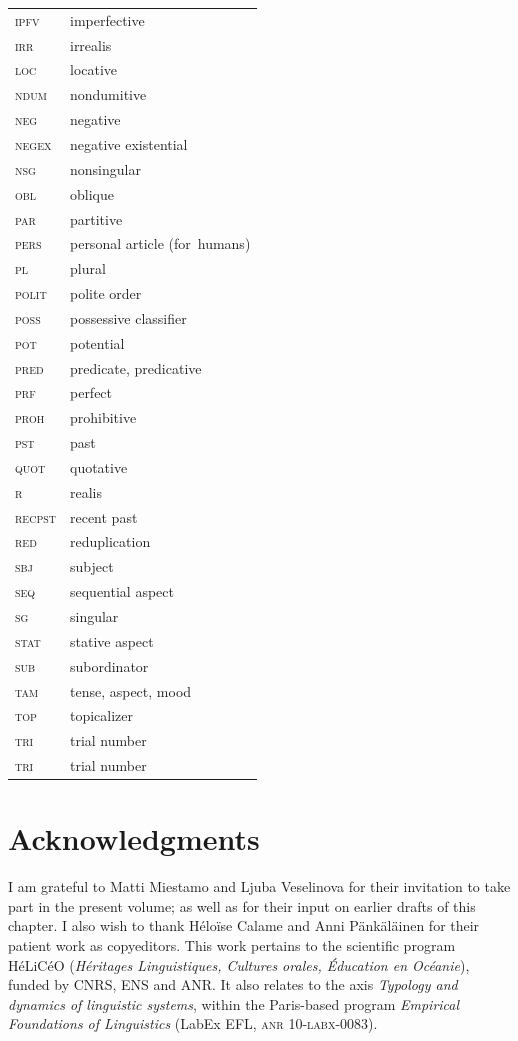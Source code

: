 \documentclass[output=paper,colorlinks,citecolor=brown,draft]{langscibook}
\begin{document}
\begin{tabularx}{.45\textwidth}{lQ}
{\scshape ipfv} & imperfective\\
{\scshape irr} & irrealis\\
{\scshape loc} & locative\\
{\scshape ndum} & nondumitive\\
{\scshape neg} & negative\\
\scshape negex & negative existential \\
{\scshape nsg} & nonsingular\\
{\scshape obl} & oblique\\
{\scshape par} & partitive\\
{\scshape pers} & personal article (for~humans)\\
{\scshape pl} & plural\\
{\scshape polit} & polite order \\
{\scshape poss} & possessive classifier \\
{\scshape pot} & potential\\
{\scshape pred} & predicate, predicative\\
{\scshape prf} & perfect\\
{\scshape proh} & prohibitive\\
{\scshape pst} & past\\
{\scshape quot} & quotative\\
\scshape r & realis \\
{\scshape recpst} & recent past\\
{\scshape red} & reduplication\\
{\scshape sbj} & subject\\
{\scshape seq} & sequential aspect\\
{\scshape sg} & singular\\
{\scshape stat} & stative aspect\\
{\scshape sub} & subordinator\\
{\scshape tam} & tense, aspect, mood \\
{\scshape top} & topicalizer\\
{\scshape tri} & trial number\\
{\scshape tri} & trial number\\
\end{tabularx}


\section*{Acknowledgments}
I am grateful to Matti Miestamo and Ljuba Veselinova for their invitation to take part in the present volume; as well as for their input on earlier drafts of this chapter. I also wish to thank Héloïse Calame and Anni Pänkäläinen for their patient work as copyeditors. This work pertains to the scientific program HéLiCéO (\textit{Héritages Linguistiques, Cultures orales, Éducation en Océanie}), funded by CNRS, ENS and ANR. It also relates to the axis \textit{Typology and dynamics of linguistic systems}, within the Paris-based program \textit{Empirical Foundations of Linguistics} (LabEx EFL, \textsc{anr} 10-\textsc{labx}-0083).
\end{document}
